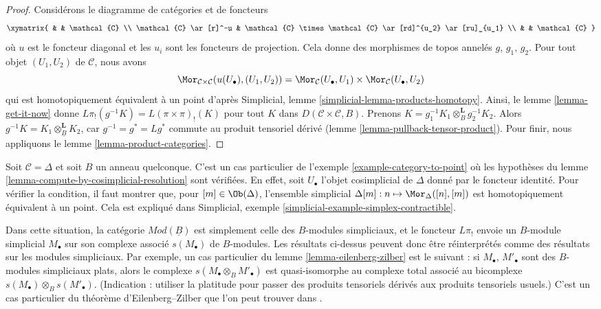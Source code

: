 \begin{proof}
Considérons le diagramme de catégories et de foncteurs
$$
\xymatrix{
& & \mathcal{C} \\
\mathcal{C} \ar[r]^-u &
\mathcal{C} \times \mathcal{C} \ar[rd]^{u_2} \ar[ru]_{u_1} \\
& & \mathcal{C}
}
$$
où $u$ est le foncteur diagonal et les $u_i$ sont les foncteurs de projection.
Cela donne des morphismes de topos annelés $g$, $g_1$, $g_2$.
Pour tout objet $(U_1, U_2)$ de $\mathcal{C}$, nous avons
$$
\Mor_{\mathcal{C} \times \mathcal{C}}(u(U_\bullet), (U_1, U_2)) =
\Mor_\mathcal{C}(U_\bullet, U_1) \times \Mor_\mathcal{C}(U_\bullet, U_2)
$$
qui est homotopiquement équivalent à un point d'après Simplicial, lemme
\ref{simplicial-lemma-products-homotopy}. Ainsi, le
lemme \ref{lemma-get-it-now} donne
$L\pi_!(g^{-1}K) = L(\pi \times \pi)_!(K)$ pour tout $K$ dans
$D(\mathcal{C} \times \mathcal{C}, B)$. Prenons
$K = g_1^{-1}K_1 \otimes_B^\mathbf{L} g_2^{-1}K_2$. Alors
$g^{-1}K = K_1 \otimes^\mathbf{L}_{\underline{B}} K_2$, car
$g^{-1} = g^* = Lg^*$ commute au produit tensoriel dérivé
(lemme \ref{lemma-pullback-tensor-product}). Pour finir, nous appliquons le
lemme \ref{lemma-product-categories}.
\end{proof}

\begin{remark}
\label{remark-simplicial-modules}
Soit $\mathcal{C} = \Delta$ et soit $B$ un anneau quelconque. C'est un cas
particulier de l'exemple \ref{example-category-to-point} où les hypothèses du
lemme \ref{lemma-compute-by-cosimplicial-resolution} sont vérifiées.
En effet, soit $U_\bullet$ l'objet cosimplicial de $\Delta$ donné par le
foncteur identité. Pour vérifier la condition, il faut montrer que, pour
$[m] \in \Ob(\Delta)$, l'ensemble simplicial
$\Delta[m] : n \mapsto \Mor_\Delta([n], [m])$ est homotopiquement équivalent
à un point. Cela est expliqué dans Simplicial, exemple
\ref{simplicial-example-simplex-contractible}.

\medskip\noindent
Dans cette situation, la catégorie $\textit{Mod}(\underline{B})$ est
simplement celle des $B$-modules simpliciaux, et le foncteur $L\pi_!$ envoie
un $B$-module simplicial $M_\bullet$ sur son complexe associé
$s(M_\bullet)$ de $B$-modules. Les résultats ci-dessus peuvent donc être
réinterprétés comme des résultats sur les modules simpliciaux. Par exemple,
un cas particulier du lemme \ref{lemma-eilenberg-zilber} est le suivant : si
$M_\bullet$, $M'_\bullet$ sont des $B$-modules simpliciaux plats, alors le
complexe $s(M_\bullet \otimes_B M'_\bullet)$ est quasi-isomorphe au complexe
total associé au bicomplexe $s(M_\bullet) \otimes_B s(M'_\bullet)$.
(Indication : utiliser la platitude pour passer des produits tensoriels
dérivés aux produits tensoriels usuels.) C'est un cas particulier du théorème
d'Eilenberg--Zilber que l'on peut trouver dans \cite{Eilenberg-Zilber}.
\end{remark}

